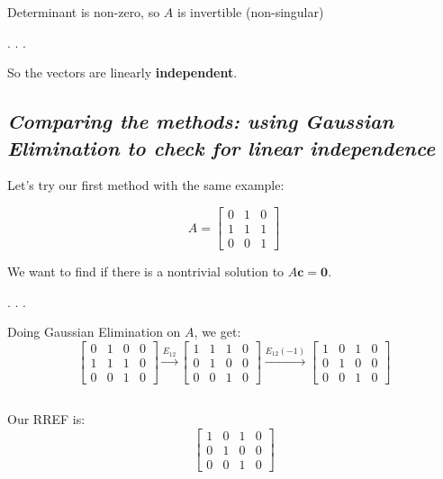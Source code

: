 \documentclass[
  letterpaper,
  DIV=11,
  numbers=noendperiod]{scrartcl}
\begin{document}
Determinant is non-zero, so \(A\) is invertible (non-singular)

. . .

So the vectors are linearly \textbf{independent}.

\subsection{\texorpdfstring{\emph{Comparing the methods: using Gaussian
Elimination to check for linear
independence}}{Comparing the methods: using Gaussian Elimination to check for linear independence}}\label{comparing-the-methods-using-gaussian-elimination-to-check-for-linear-independence}

Let's try our first method with the same example:

\[
A = \left[\begin{array}{ccc}
0 & 1 & 0 \\
1 & 1 & 1 \\
0 & 0 & 1
\end{array}\right]
\]

We want to find if there is a nontrivial solution to
\(A \mathbf{c}=\mathbf{0}\).

. . .

Doing Gaussian Elimination on \(A\), we get: \[
\left[\begin{array}{ccc|c}
0 & 1 & 0 & 0 \\
1 & 1 & 1 & 0 \\
0 & 0 & 1 & 0
\end{array}\right] 
\xrightarrow{E_{12}}
\left[\begin{array}{ccc|c}
1 & 1 & 1 & 0 \\
0 & 1 & 0 & 0 \\
0 & 0 & 1 & 0
\end{array}\right]
\xrightarrow{E_{12}(-1)}
\left[\begin{array}{ccc|c}
1 & 0 & 1 & 0 \\
0 & 1 & 0 & 0 \\
0 & 0 & 1 & 0
\end{array}\right]
\]

\subsection{\texorpdfstring{\emph{}}{}}\label{section-3}

Our RREF is: \[
\left[\begin{array}{ccc|c}
1 & 0 & 1 & 0 \\
0 & 1 & 0 & 0 \\
0 & 0 & 1 & 0
\end{array}\right]
\]
\end{document}
